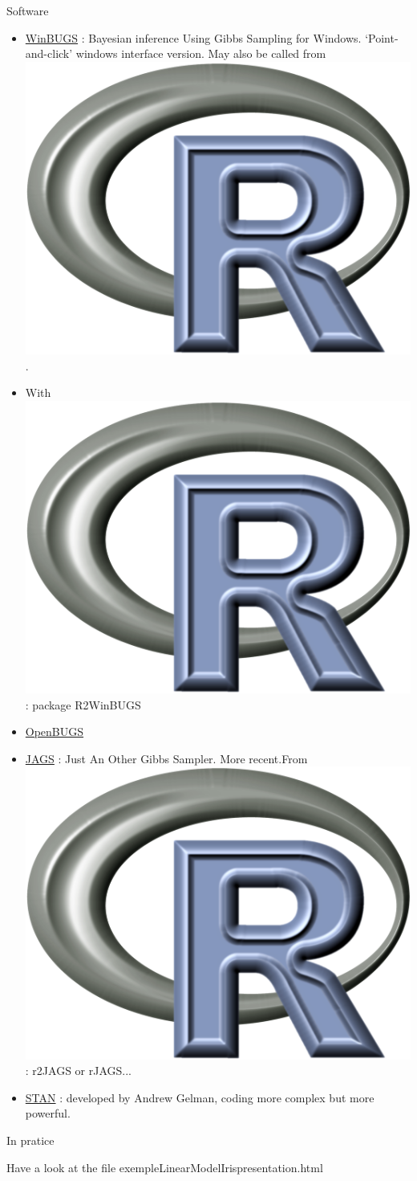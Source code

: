 \begin{frame}{Software}
\begin{itemize}
  \item \href{http://www.mrc-bsu.cam.ac.uk/software/}{WinBUGS} : Bayesian inference Using Gibbs Sampling for Windows.  `Point-and-click’ windows interface version. May also be called from   \includegraphics[width=0.05\linewidth]{figures/Rlogo-1.png}.  
  \item  With    \includegraphics[width=0.05\linewidth]{figures/Rlogo-1.png} : package \textsf{R2WinBUGS}
  \item  \href{http://www.openbugs.net/w/FrontPage}{OpenBUGS} 
 \item \href{http://mcmc-jags.sourceforge.net/}{JAGS} : Just An Other Gibbs Sampler. More recent.From   \includegraphics[width=0.05\linewidth]{figures/Rlogo-1.png}: r2JAGS or rJAGS...
 \item \href{https://mc-stan.org/}{STAN} : developed by Andrew Gelman, coding more complex but more powerful. 
 \end{itemize}
  
 \end{frame}
 
\begin{frame}{In pratice}
 \centering

Have a look at the file  
exempleLinearModelIrispresentation.html

 

  
\end{frame}
  
